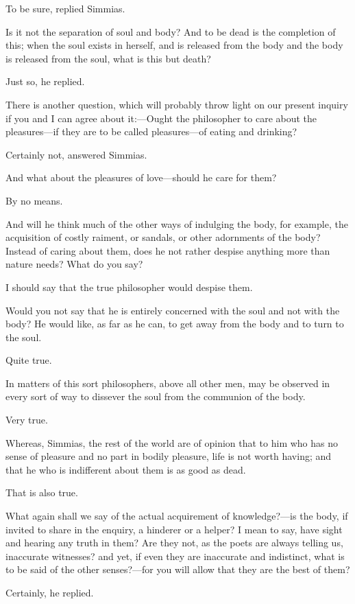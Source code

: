 To be sure, replied Simmias.

Is it not the separation of soul and body? And to be dead is the
completion of this; when the soul exists in herself, and is released from
the body and the body is released from the soul, what is this but death?

Just so, he replied.

There is another question, which will probably throw light on our present
inquiry if you and I can agree about it:—Ought the philosopher to
care about the pleasures—if they are to be called pleasures—of
eating and drinking?

Certainly not, answered Simmias.

And what about the pleasures of love—should he care for them?

By no means.

And will he think much of the other ways of indulging the body, for
example, the acquisition of costly raiment, or sandals, or other
adornments of the body? Instead of caring about them, does he not rather
despise anything more than nature needs? What do you say?

I should say that the true philosopher would despise them.

Would you not say that he is entirely concerned with the soul and not with
the body? He would like, as far as he can, to get away from the body and
to turn to the soul.

Quite true.

In matters of this sort philosophers, above all other men, may be observed
in every sort of way to dissever the soul from the communion of the body.

Very true.

Whereas, Simmias, the rest of the world are of opinion that to him who has
no sense of pleasure and no part in bodily pleasure, life is not worth
having; and that he who is indifferent about them is as good as dead.

That is also true.

What again shall we say of the actual acquirement of knowledge?—is
the body, if invited to share in the enquiry, a hinderer or a helper? I
mean to say, have sight and hearing any truth in them? Are they not, as
the poets are always telling us, inaccurate witnesses? and yet, if even
they are inaccurate and indistinct, what is to be said of the other
senses?—for you will allow that they are the best of them?

Certainly, he replied.

